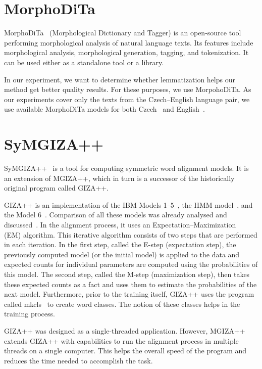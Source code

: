\section{MorphoDiTa}
\label{section:morphodita}

MorphoDiTa~\cite{Strakova14}\cite{Spoustova09} (Morphological Dictionary and Tagger) is an open-source tool performing morphological analysis of natural language texts. Its features include morphological analysis, morphological generation, tagging, and tokenization. It can be used either as a standalone tool or a library. 

In our experiment, we want to determine whether lemmatization helps our method get better quality results. For these purposes, we use MorpohoDiTa. As our experiments cover only the texts from the Czech--English language pair, we use available MorphoDiTa models for both Czech~\cite{Straka13} and English~\cite{Straka14}.

\section{SyMGIZA++}
\label{section:symgiza}

SyMGIZA++~\cite{Junczys10} is a tool for computing symmetric word alignment models. It is an extension of MGIZA++, which in turn is a successor of the historically original program called GIZA++.

GIZA++ is an implementation of the IBM Models 1--5~\cite{Brown93}, the HMM model~\cite{Vogel96}, and the Model 6~\cite{Och03}. Comparison of all these models was already analysed and discussed~\cite{Och03}. In the alignment process, it uses an Expectation–Maximization~\cite{Dempster77} (EM) algorithm. This iterative algorithm consists of two steps that are performed in each iteration. In the first step, called the E-step (expectation step), the previously computed model (or the initial model) is applied to the data and expected counts for individual parameters are computed using the probabilities of this model. The second step, called the M-step (maximization step), then takes these expected counts as a fact and uses them to estimate the probabilities of the next model. Furthermore, prior to the training itself, GIZA++ uses the program called mkcls~\cite{Och99} to create word classes. The notion of these classes helps in the training process.

GIZA++ was designed as a single-threaded application. However, MGIZA++~\cite{Gao08} extends GIZA++ with capabilities to run the alignment process in multiple threads on a single computer. This helps the overall speed of the program and reduces the time needed to accomplish the task.

